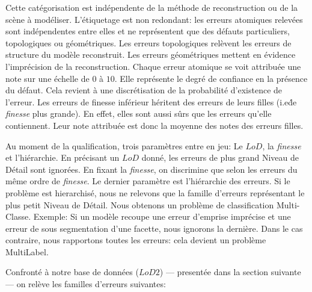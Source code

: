\documentclass[a4paper,french]{article}
\begin{document}
    Cette catégorisation est indépendente de la méthode de reconstruction ou de la scène à modéliser. L'étiquetage est non redondant: les erreurs atomiques relevées sont indépendentes entre elles et ne représentent que des défauts particuliers, topologiques ou géométriques. Les erreurs topologiques relèvent les erreurs de structure du modèle reconstruit. Les erreurs géométriques mettent en évidence l'imprécision de la reconstruction. Chaque erreur atomique se voit attribuée une note sur une échelle de $0$ à $10$. Elle représente le degré de confiance en la présence du défaut. Cela revient à une discrétisation de la probabilité d'existence de l'erreur. Les erreurs de finesse inférieur héritent des erreurs de leurs filles (i.e\. de \emph{finesse} plus grande). En effet, elles sont aussi sûrs que les erreurs qu'elle contiennent. Leur note attribuée est donc la moyenne des notes des erreurs filles.

    Au moment de la qualification, trois paramètres entre en jeu: Le $LoD$, la \emph{finesse} et l'hiérarchie. En précisant un $LoD$ donné, les erreurs de plus grand Niveau de Détail sont ignorées. En fixant la \emph{finesse}, on discrimine que selon les erreurs du même ordre de \emph{finesse}. Le dernier paramètre est l'hiérarchie des erreurs. Si le problème est hierarchisé, nous ne relevons que la famille d'erreurs représentant le plus petit Niveau de Détail. Nous obtenons un problème de classification Multi-Classe. Exemple: Si un modèle recoupe une erreur d'emprise imprécise et une erreur de sous segmentation d'une facette, nous ignorons la dernière. Dans le cas contraire, nous rapportons toutes les erreurs: cela devient un problème MultiLabel.

    Confronté à notre base de données ($LoD 2$) --- presentée dans la section suivante --- on relève les familles d'erreurs suivantes:
\end{document}
